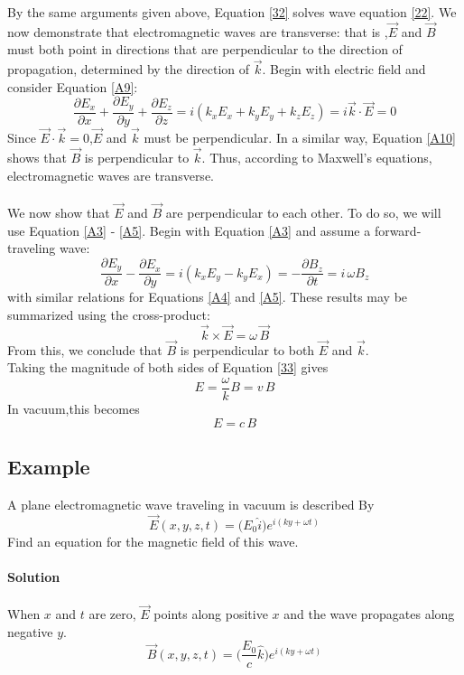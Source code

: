 \documentclass[12pt]{article}
\numberwithin{equation}{section}
\begin{document}
By the same arguments given above, Equation \eqref{32} solves wave equation \eqref{22}.
\indent We now demonstrate that electromagnetic waves are transverse: that is ,$\vec{E}$ and $\vec{B}$ must both point in directions that are perpendicular to the direction of propagation,
determined by the direction of $\vec{k}$. Begin with electric field and consider Equation \eqref{A9}:
\\
\[
    \frac{\partial{E_x}}{\partial{x}}+\frac{\partial{E_y}}{\partial{y}}+\frac{\partial{E_z}}{\partial{z}}=i(k_xE_x+k_yE_y+k_zE_z)=i\vec{k}\cdot\vec{E}=0
\]
Since $\vec{E}\cdot\vec{k}=0$,$\vec{E}$ and $\vec{k}$ must be perpendicular. In a similar way, Equation \eqref{A10} shows that $\vec{B}$ is perpendicular to
$\vec{k}$. Thus, according to Maxwell's equations, electromagnetic waves are transverse.
\\
\\
\indent We now show that $\vec{E}$ and $\vec{B}$ are perpendicular to each other. To do so, we will use Equation \eqref{A3} - \eqref{A5}. Begin with Equation \eqref{A3} and assume a forward-traveling wave:
\[
    \frac{\partial{E_y}}{\partial{x}}-\frac{\partial{E_x}}{\partial{y}}=i(k_xE_y-k_yE_x)=-\frac{\partial{B_z}}{\partial{t}}=i\,\omega B_z
\]
with similar relations for Equations \eqref{A4} and \eqref{A5}. These results may be summarized using the cross-product:
\begin{equation}
    \vec{k}\times\vec{E}=\omega\,\vec{B}\label{33}
\end{equation}
From this, we conclude that $\vec{B}$ is perpendicular to both $\vec{E}$ and $\vec{k}$.\\
\indent Taking the magnitude of both sides of Equation \eqref{33} gives
\begin{equation}
    E=\frac{\omega}{k}B=v\, B\label{34}
\end{equation}
In vacuum,this becomes
\begin{equation}
    E=c\, B\label{35}
\end{equation}
\subsection{Example}
A plane electromagnetic wave traveling in vacuum is described By
\[
    \vec{E}(x,y,z,t)=\big(E_0\hat{i}\big)e^{i(ky+\omega t)}
\]
Find an equation for the magnetic field of this wave.
\\
\\
\textbf{Solution}
\\
\\
When $x$ and $t$ are zero, $\vec{E}$ points along positive $x$ and the wave propagates along negative $y$.
\[
    \vec{B}(x,y,z,t)=\biggl(\frac{E_0}{c}\hat{k}\biggl)e^{i(ky+\omega t)}
\]
\end{document}
